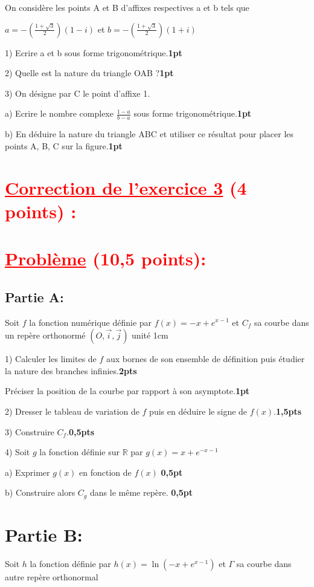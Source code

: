 \documentclass[12pt]{article}
\begin{document}
On considère les points A et B d’affixes respectives a et b tels que

$a=-(\frac{1+\sqrt{3}}{2})(1-i)$ et $b=-(\frac{1+\sqrt{3}}{2})(1+i)$ 

1) Ecrire a et b sous forme trigonométrique.\textbf{1pt}

2) Quelle est la nature du triangle OAB ?\textbf{1pt}

3) On désigne par C le point d’affixe 1.

a) Ecrire le nombre complexe $\frac{1-a}{b-a}$  sous forme trigonométrique.\textbf{1pt}

b) En déduire la nature du triangle ABC et  utiliser ce résultat pour placer les points A, B, C sur la figure.\textbf{1pt}
\section*{\textcolor{red}{\underline{Correction de l'exercice 3} (4 points) :}}
\section*{\textcolor{red}{\underline{Problème} (10,5 points):}}
\subsection*{Partie A:}
Soit $f$ la fonction numérique définie par $f(x)=-x+e^{x-1}$  et $C_{f}$ sa courbe dans un repère orthonormé $(O,\vec{i},\vec{j})$ unité 1cm

1) Calculer les limites de $f$ aux bornes de son ensemble de définition puis étudier la nature des branches infinies.\textbf{2pts}

Préciser la position de la courbe par rapport à son asymptote.\textbf{1pt}

2) Dresser le tableau de variation de $f$ puis en déduire le signe de $f(x)$.\textbf{1,5pts}

3) Construire $C_{f}$.\textbf{0,5pts}

4) Soit $g$ la fonction définie sur $\mathbb{R}$ par $g(x)=x+e^{-x-1}$

  a) Exprimer $g(x)$ en fonction de $f(x)$ \textbf{0,5pt}
  
  b) Construire alors $C_{g}$ dans le même repère.  \textbf{0,5pt}
\section*{Partie B:}
Soit $h$ la fonction définie par $h(x)=\ln(-x+e^{x-1})$  et $\Gamma$ sa courbe dans autre repère orthonormal
\end{document}
